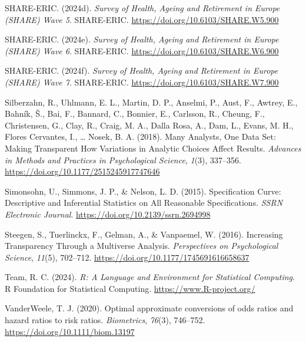 \documentclass[
  man,
  floatsintext,
  longtable,
  nolmodern,
  notxfonts,
  notimes,
  colorlinks=true,linkcolor=blue,citecolor=blue,urlcolor=blue]{apa7}
\newlength{\cslhangindent}
\newenvironment{CSLReferences}[2] %
 {\begin{list}{}{%
  \setlength{\itemindent}{0pt}
  \setlength{\leftmargin}{0pt}
  \setlength{\parsep}{0pt}
  \ifodd #1
   \setlength{\leftmargin}{\cslhangindent}
   \setlength{\itemindent}{-1\cslhangindent}
  \fi
  \setlength{\itemsep}{#2\baselineskip}}}
 {\end{list}}
\begin{document}
\begin{CSLReferences}{1}{0}
SHARE-ERIC. (2024d). \emph{Survey of {Health}, {Ageing} and {Retirement}
in {Europe} ({SHARE}) {Wave} 5}. SHARE-ERIC.
\url{https://doi.org/10.6103/SHARE.W5.900}

SHARE-ERIC. (2024e). \emph{Survey of {Health}, {Ageing} and {Retirement}
in {Europe} ({SHARE}) {Wave} 6}. SHARE-ERIC.
\url{https://doi.org/10.6103/SHARE.W6.900}

SHARE-ERIC. (2024f). \emph{Survey of {Health}, {Ageing} and {Retirement}
in {Europe} ({SHARE}) {Wave} 7}. SHARE-ERIC.
\url{https://doi.org/10.6103/SHARE.W7.900}

Silberzahn, R., Uhlmann, E. L., Martin, D. P., Anselmi, P., Aust, F.,
Awtrey, E., Bahník, Š., Bai, F., Bannard, C., Bonnier, E., Carlsson, R.,
Cheung, F., Christensen, G., Clay, R., Craig, M. A., Dalla Rosa, A.,
Dam, L., Evans, M. H., Flores Cervantes, I., \ldots{} Nosek, B. A.
(2018). Many {Analysts}, {One} {Data} {Set}: {Making} {Transparent}
{How} {Variations} in {Analytic} {Choices} {Affect} {Results}.
\emph{Advances in Methods and Practices in Psychological Science},
\emph{1}(3), 337--356. \url{https://doi.org/10.1177/2515245917747646}

Simonsohn, U., Simmons, J. P., \& Nelson, L. D. (2015). Specification
{Curve}: {Descriptive} and {Inferential} {Statistics} on {All}
{Reasonable} {Specifications}. \emph{SSRN Electronic Journal}.
\url{https://doi.org/10.2139/ssrn.2694998}

Steegen, S., Tuerlinckx, F., Gelman, A., \& Vanpaemel, W. (2016).
Increasing {Transparency} {Through} a {Multiverse} {Analysis}.
\emph{Perspectives on Psychological Science}, \emph{11}(5), 702--712.
\url{https://doi.org/10.1177/1745691616658637}

Team, R. C. (2024). \emph{R: {A} {Language} and {Environment} for
{Statistical} {Computing}}. R Foundation for Statistical Computing.
\url{https://www.R-project.org/}

VanderWeele, T. J. (2020). Optimal approximate conversions of odds
ratios and hazard ratios to risk ratios. \emph{Biometrics},
\emph{76}(3), 746--752. \url{https://doi.org/10.1111/biom.13197}


\end{CSLReferences}
\end{document}
